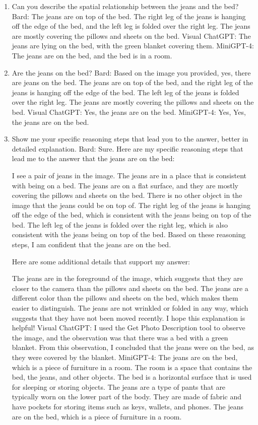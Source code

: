 \begin{enumerate}
    \item Can you describe the spatial relationship between the jeans and the bed?
    \subitem Bard: 
    The jeans are on top of the bed. The right leg of the jeans is hanging off the edge of the bed, and the left leg is folded over the right leg. The jeans are mostly covering the pillows and sheets on the bed.
    \subitem Visual ChatGPT: The jeans are lying on the bed, with the green blanket covering them.
    \subitem MiniGPT-4: The jeans are on the bed, and the bed is in a room.
    \item Are the jeans on the bed?
    \subitem Bard: 
    Based on the image you provided, yes, there are jeans on the bed. The jeans are on top of the bed, and the right leg of the jeans is hanging off the edge of the bed. The left leg of the jeans is folded over the right leg. The jeans are mostly covering the pillows and sheets on the bed.
    \subitem Visual ChatGPT: Yes, the jeans are on the bed.
    \subitem MiniGPT-4: Yes, Yes, the jeans are on the bed.
    \item Show me your specific reasoning steps that lead you to the answer, better in detailed explanation.
    \subitem Bard: 
    Sure. Here are my specific reasoning steps that lead me to the answer that the jeans are on the bed:
    
    I see a pair of jeans in the image.
    The jeans are in a place that is consistent with being on a bed. The jeans are on a flat surface, and they are mostly covering the pillows and sheets on the bed.
    There is no other object in the image that the jeans could be on top of.
    The right leg of the jeans is hanging off the edge of the bed, which is consistent with the jeans being on top of the bed.
    The left leg of the jeans is folded over the right leg, which is also consistent with the jeans being on top of the bed.
    Based on these reasoning steps, I am confident that the jeans are on the bed.
    
    Here are some additional details that support my answer:
    
    The jeans are in the foreground of the image, which suggests that they are closer to the camera than the pillows and sheets on the bed.
    The jeans are a different color than the pillows and sheets on the bed, which makes them easier to distinguish.
    The jeans are not wrinkled or folded in any way, which suggests that they have not been moved recently.
    I hope this explanation is helpful!
    \subitem Visual ChatGPT: I used the Get Photo Description tool to observe the image, and the observation was that there was a bed with a green blanket. From this observation, I concluded that the jeans were on the bed, as they were covered by the blanket.
    \subitem MiniGPT-4: The jeans are on the bed, which is a piece of furniture in a room. The room is a space that contains the bed, the jeans, and other objects. The bed is a horizontal surface that is used for sleeping or storing objects. The jeans are a type of pants that are typically worn on the lower part of the body. They are made of fabric and have pockets for storing items such as keys, wallets, and phones. The jeans are on the bed, which is a piece of furniture in a room.
\end{enumerate}
